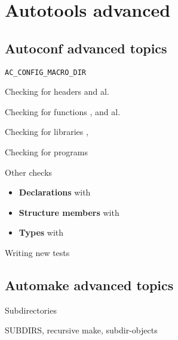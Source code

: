 \section{Autotools advanced}

\subsection{Autoconf advanced topics}

\begin{frame}{{\tt AC\_CONFIG\_MACRO\_DIR}}

\end{frame}

\begin{frame}{Checking for headers}
   and al.
\end{frame}

\begin{frame}{Checking for functions}
  ,  and al.
\end{frame}

\begin{frame}{Checking for libraries}
  , 
\end{frame}

\begin{frame}{Checking for programs}
\end{frame}

\begin{frame}{Other checks}
  \begin{itemize}
  \item {\bf Declarations} with 
  \item {\bf Structure members} with 
  \item {\bf Types} with 
  \end{itemize}
\end{frame}

\begin{frame}{Writing new tests}

\end{frame}

\subsection{Automake advanced topics}

\begin{frame}{Subdirectories}

SUBDIRS, recursive make, subdir-objects

\end{frame}

